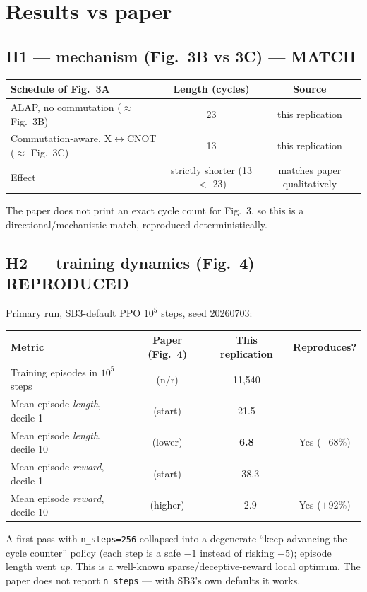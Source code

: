 \documentclass[11pt]{article}
\begin{document}
\section{Results vs paper}

\subsection*{H1 --- mechanism (Fig.~3B vs 3C) --- MATCH}
\begin{tabular}{lcc}
\toprule
Schedule of Fig.~3A & Length (cycles) & Source \\
\midrule
ALAP, no commutation ($\approx$ Fig.~3B) & 23 & this replication \\
Commutation-aware, X$\leftrightarrow$CNOT ($\approx$ Fig.~3C) & 13 & this replication \\
Effect & strictly shorter (13 $<$ 23) & matches paper qualitatively \\
\bottomrule
\end{tabular}

The paper does not print an exact cycle count for Fig.~3, so this is a
directional/mechanistic match, reproduced deterministically.

\subsection*{H2 --- training dynamics (Fig.~4) --- REPRODUCED}
Primary run, SB3-default PPO $10^5$ steps, seed 20260703:
\begin{tabular}{lccc}
\toprule
Metric & Paper (Fig.~4) & This replication & Reproduces? \\
\midrule
Training episodes in $10^5$ steps  & (n/r)         & 11{,}540 & --- \\
Mean episode \emph{length}, decile 1 & (start)     & 21.5     & --- \\
Mean episode \emph{length}, decile 10 & (lower)    & \textbf{6.8}  & Yes ($-68\%$) \\
Mean episode \emph{reward}, decile 1 & (start)     & $-38.3$  & --- \\
Mean episode \emph{reward}, decile 10 & (higher)   & \textbf{$-2.9$} & Yes ($+92\%$) \\
\bottomrule
\end{tabular}

A first pass with \texttt{n\_steps=256} collapsed into a degenerate
``keep advancing the cycle counter'' policy (each step is a safe $-1$ instead
of risking $-5$); episode length went \emph{up}. This is a well-known
sparse/deceptive-reward local optimum. The paper does not report
\texttt{n\_steps} --- with SB3's own defaults it works.
\end{document}
